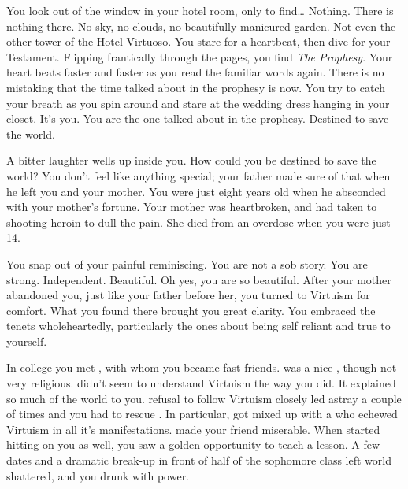 \documentclass[char]{guildcamp1}
\begin{document}
\name{\cBride{}}

You look out of the window in your hotel room, only to find{\ldots} Nothing. There is nothing there. No sky, no clouds, no beautifully manicured garden. Not even the other tower of the Hotel Virtuoso. You stare for a heartbeat, then dive for your Testament. Flipping frantically through the pages, you find {\em The Prophesy}. Your heart beats faster and faster as you read the familiar words again. There is no mistaking that the time talked about in the prophesy is now. You try to catch your breath as you spin around and stare at the wedding dress hanging in your closet. It's you. You are the one talked about in the prophesy. Destined to save the world.

A bitter laughter wells up inside you. How could you be destined to save the world? You don't feel like anything special; your father made sure of that when he left you and your mother. You were just eight years old when he absconded with your mother's fortune. Your mother was heartbroken, and had taken to shooting heroin to dull the pain. She died from an overdose when you were just 14.

You snap out of your painful reminiscing. You are not a sob story. You are strong. Independent. Beautiful. Oh yes, you are so beautiful. After your mother abandoned you, just like your father before her, you turned to Virtuism for comfort. What you found there brought you great clarity. You embraced the tenets wholeheartedly, particularly the ones about being self reliant and true to yourself.

In college you met \cRival{}, with whom you became fast friends. \cRival{\They} was a nice \cRival{\kid}, though not very religious. \cRival{\They} didn't seem to understand Virtuism the way you did. It explained so much of the world to you. \cRival{\Them} refusal to follow Virtuism closely led \cRival{} astray a couple of times and you had to rescue \cRival{\them}. In particular, \cRival{\they} got \cRival{\themself} mixed up with a \cRivalEx{\kid} who echewed Virtuism in all it's manifestations. \cRivalEx{\They} made your friend miserable. When \cRivalEx{\they} started hitting on you as well, you saw a golden opportunity to teach \cRivalEx{\them} a lesson. A few dates and a dramatic break-up in front of half of the sophomore class left \cRivalEx{\their} world shattered, and you drunk with power.
\end{document}

